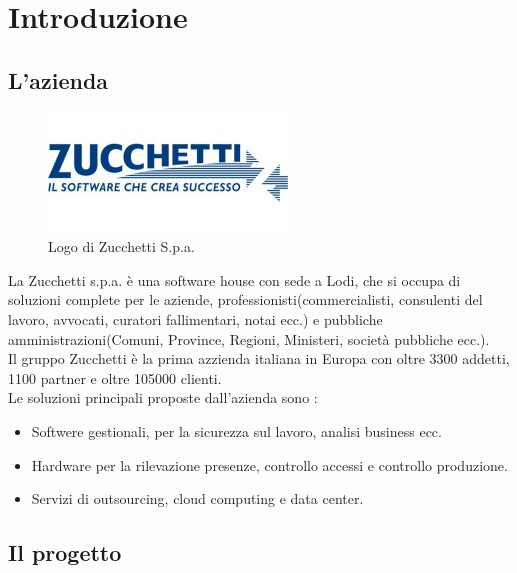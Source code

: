 
\chapter{Introduzione}
\label{cap:introduzione}

\section{L'azienda}

\begin{figure}[htp]
\centering
\includegraphics[width=\textwidth/2]{../immagini/zucchetti_logo}
\caption{Logo di Zucchetti S.p.a.}
\end{figure}

La Zucchetti s.p.a. è una software house con sede a Lodi, che si occupa di soluzioni complete per le aziende, professionisti(commercialisti, consulenti del lavoro, avvocati, curatori fallimentari, notai ecc.) e pubbliche amministrazioni(Comuni, Province, Regioni, Ministeri, società pubbliche ecc.).\\
Il gruppo Zucchetti è la prima azzienda italiana in Europa con oltre 3300 addetti, 1100 partner e oltre 105000 clienti.\\
Le soluzioni principali proposte dall'azienda sono :\\
\begin{itemize}
\item Softwere gestionali, per la sicurezza sul lavoro, analisi business ecc.
\item Hardware per la rilevazione presenze, controllo accessi e controllo produzione.
\item Servizi di outsourcing, cloud computing e data center.
\end{itemize}

\section{Il progetto}
